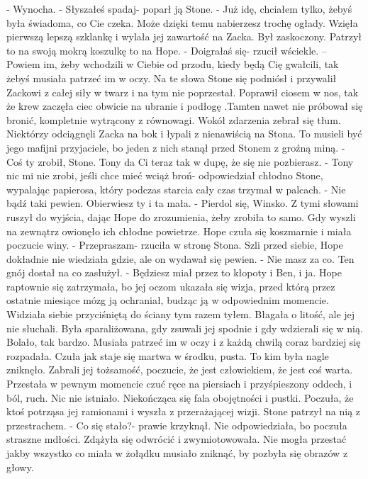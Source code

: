 \documentclass[12pt,a4paper]{book}
\begin{document}
- Wynocha.
- Słyszałeś spadaj- poparł ją Stone. 
- Już idę, chciałem tylko, żebyś była świadoma, co Cie czeka. Może dzięki temu nabierzesz trochę ogłady. 
Wzięła pierwszą lepszą szklankę i wylała jej zawartość na Zacka. Był zaskoczony. Patrzył to na swoją mokrą koszulkę to na Hope. 
- Doigrałaś się- rzucił wściekle. – Powiem im, żeby wchodzili w Ciebie od przodu, kiedy będą Cię gwałcili, tak żebyś musiała patrzeć im w oczy.
Na te słowa Stone się podniósł i przywalił Zackowi z całej siły w twarz i na tym nie poprzestał. Poprawił ciosem w nos, tak że krew zaczęła ciec obwicie na ubranie i podłogę .Tamten nawet nie próbował się bronić, kompletnie wytrącony z równowagi. 
Wokół zdarzenia zebrał się tłum. Niektórzy odciągnęli Zacka na bok i łypali z nienawiścią na Stona. To musieli być jego mafijni przyjaciele, bo jeden z nich stanął przed Stonem z groźną miną. 
- Coś ty zrobił, Stone. Tony da Ci teraz tak w dupę, że się nie pozbierasz. 
- Tony nic mi nie zrobi, jeśli chce mieć wciąż broń- odpowiedział chłodno Stone, wypalając papierosa, który podczas starcia cały czas trzymał w palcach. 
- Nie bądź taki pewien. Obierwiesz ty i ta mała. 
- Pierdol się, Winsko. 
Z tymi słowami ruszył do wyjścia, dając Hope do zrozumienia, żeby zrobiła to samo. 
Gdy wyszli na zewnątrz owionęło ich chłodne powietrze. Hope czuła się koszmarnie i miała poczucie winy. 
- Przepraszam- rzuciła w stronę Stona. 
Szli przed siebie, Hope dokładnie nie wiedziała gdzie, ale on wydawał się pewien. 
- Nie masz za co. Ten gnój dostał na co zasłużył. 
- Będziesz miał przez to kłopoty i Ben, i ja. 
Hope raptownie się zatrzymała, bo jej oczom ukazała się wizja, przed którą przez ostatnie miesiące mózg ją ochraniał, budząc ją w odpowiednim momencie. Widziała siebie przyciśniętą do ściany tym razem tyłem. Błagała o litość, ale jej nie słuchali. Była sparaliżowana, gdy zsuwali jej spodnie i gdy wdzierali się w nią. Bolało, tak bardzo. Musiała patrzeć im w oczy i z każdą chwilą coraz bardziej się rozpadała. Czuła jak staje się martwa w środku, pusta. To kim była nagle zniknęło. Zabrali jej tożsamość, poczucie, że jest człowiekiem, że jest coś warta. Przestała w pewnym momencie czuć ręce na piersiach i przyśpieszony oddech, i ból, ruch. Nic nie istniało. Niekończąca się fala obojętności i pustki. 
Poczuła, że ktoś potrząsa jej ramionami i wyszła z przerażającej wizji. Stone patrzył na nią z przestrachem. 
- Co się stało?- prawie krzyknął. 
Nie odpowiedziała, bo poczuła straszne mdłości. Zdążyła się odwrócić i zwymiotowowała. Nie mogła przestać jakby wszystko co miała w żołądku musiało zniknąć, by pozbyła się obrazów z głowy. 
\end{document}
